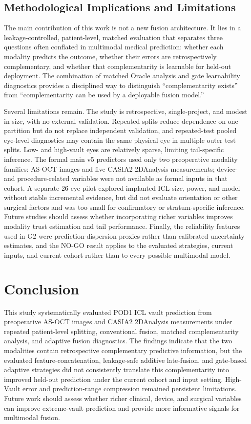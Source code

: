 \documentclass[10pt,twocolumn]{article}
\begin{document}
\subsection{Methodological Implications and Limitations}

The main contribution of this work is not a new fusion architecture. It lies in a leakage-controlled, patient-level, matched evaluation that separates three questions often conflated in multimodal medical prediction: whether each modality predicts the outcome, whether their errors are retrospectively complementary, and whether that complementarity is learnable for held-out deployment. The combination of matched Oracle analysis and gate learnability diagnostics provides a disciplined way to distinguish ``complementarity exists'' from ``complementarity can be used by a deployable fusion model.''

Several limitations remain. The study is retrospective, single-project, and modest in size, with no external validation. Repeated splits reduce dependence on one partition but do not replace independent validation, and repeated-test pooled eye-level diagnostics may contain the same physical eye in multiple outer test splits. Low- and high-vault eyes are relatively sparse, limiting tail-specific inference. The formal main v5 predictors used only two preoperative modality families: AS-OCT images and five CASIA2 2DAnalysis measurements; device- and procedure-related variables were not available as formal inputs in that cohort. A separate 26-eye pilot explored implanted ICL size, power, and model without stable incremental evidence, but did not evaluate orientation or other surgical factors and was too small for confirmatory or stratum-specific inference. Future studies should assess whether incorporating richer variables improves modality trust estimation and tail performance. Finally, the reliability features used in G2 were prediction-dispersion proxies rather than calibrated uncertainty estimates, and the NO-GO result applies to the evaluated strategies, current inputs, and current cohort rather than to every possible multimodal model.

\section{Conclusion}

This study systematically evaluated POD1 ICL vault prediction from preoperative AS-OCT images and CASIA2 2DAnalysis measurements under repeated patient-level splitting, conventional fusion, matched complementarity analysis, and adaptive fusion diagnostics. The findings indicate that the two modalities contain retrospective complementary predictive information, but the evaluated feature-concatenation, leakage-safe additive late-fusion, and gate-based adaptive strategies did not consistently translate this complementarity into improved held-out prediction under the current cohort and input setting. High-Vault error and prediction-range compression remained persistent limitations. Future work should assess whether richer clinical, device, and surgical variables can improve extreme-vault prediction and provide more informative signals for multimodal fusion.

\begingroup
\small


\endgroup
\end{document}
